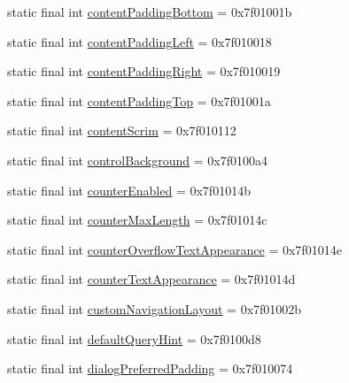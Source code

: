 \begin{CompactItemize}
static final int \hyperlink{classandroid_1_1support_1_1v7_1_1recyclerview_1_1_r_1_1attr_d628484b715dd9e5aea7b4bc9b6c1ab6}{contentPaddingBottom} = 0x7f01001b
\item 
static final int \hyperlink{classandroid_1_1support_1_1v7_1_1recyclerview_1_1_r_1_1attr_88a1cf4a23a8804c17e839d2ec021b2a}{contentPaddingLeft} = 0x7f010018
\item 
static final int \hyperlink{classandroid_1_1support_1_1v7_1_1recyclerview_1_1_r_1_1attr_d981efd45b876679ce83138c03b6e30c}{contentPaddingRight} = 0x7f010019
\item 
static final int \hyperlink{classandroid_1_1support_1_1v7_1_1recyclerview_1_1_r_1_1attr_3b0a1452edd7d02347481d6cbbbb31b8}{contentPaddingTop} = 0x7f01001a
\item 
static final int \hyperlink{classandroid_1_1support_1_1v7_1_1recyclerview_1_1_r_1_1attr_480ad2a5ff95594cc1c35fd79fd555c7}{contentScrim} = 0x7f010112
\item 
static final int \hyperlink{classandroid_1_1support_1_1v7_1_1recyclerview_1_1_r_1_1attr_586ec30907031b874a8c7c055cbf440e}{controlBackground} = 0x7f0100a4
\item 
static final int \hyperlink{classandroid_1_1support_1_1v7_1_1recyclerview_1_1_r_1_1attr_7551331f9abc2573d8863e9851b8962c}{counterEnabled} = 0x7f01014b
\item 
static final int \hyperlink{classandroid_1_1support_1_1v7_1_1recyclerview_1_1_r_1_1attr_6035be94c4a7f9a62ed62e0bbba7b82b}{counterMaxLength} = 0x7f01014c
\item 
static final int \hyperlink{classandroid_1_1support_1_1v7_1_1recyclerview_1_1_r_1_1attr_3e5b4cf97068612b73cb5e5d1683fa83}{counterOverflowTextAppearance} = 0x7f01014e
\item 
static final int \hyperlink{classandroid_1_1support_1_1v7_1_1recyclerview_1_1_r_1_1attr_d1ec770bfc8ef72c710ee2454970fe63}{counterTextAppearance} = 0x7f01014d
\item 
static final int \hyperlink{classandroid_1_1support_1_1v7_1_1recyclerview_1_1_r_1_1attr_57fff3065f8568cb707d7ce7777d2768}{customNavigationLayout} = 0x7f01002b
\item 
static final int \hyperlink{classandroid_1_1support_1_1v7_1_1recyclerview_1_1_r_1_1attr_9a8d6ab94be3c83a9dda68af36ffa427}{defaultQueryHint} = 0x7f0100d8
\item 
static final int \hyperlink{classandroid_1_1support_1_1v7_1_1recyclerview_1_1_r_1_1attr_b54eee63333dae2c9ab8e5bfa7608b82}{dialogPreferredPadding} = 0x7f010074
\item 

\end{CompactItemize}
